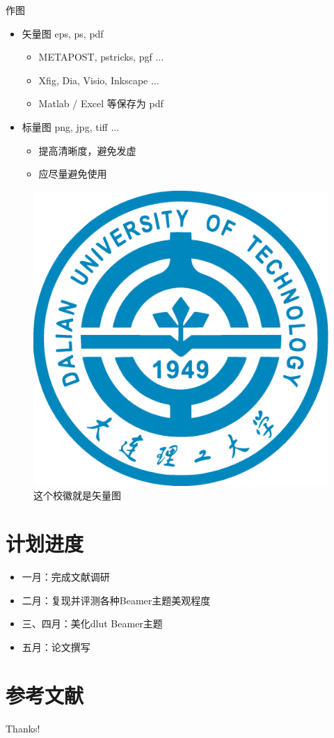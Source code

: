 \documentclass{beamer}
\begin{document}
\begin{frame}{作图}
    \begin{itemize}
        \item 矢量图 eps, ps, pdf
        \begin{itemize}
            \item METAPOST, pstricks, pgf $\ldots$
            \item Xfig, Dia, Visio, Inkscape $\ldots$
            \item Matlab / Excel 等保存为 pdf
        \end{itemize}
        \item 标量图 png, jpg, tiff $\ldots$
        \begin{itemize}
            \item 提高清晰度，避免发虚
            \item 应尽量避免使用
        \end{itemize}
    \end{itemize}
    \begin{figure}[htpb]
        \centering
        \includegraphics[width=0.2\linewidth]{pic/DLUT-logo.eps}
        \caption{这个校徽就是矢量图}
    \end{figure}
\end{frame}


\section{计划进度}
\begin{frame}
    \begin{itemize}
        \item 一月：完成文献调研
        \item 二月：复现并评测各种Beamer主题美观程度
        \item 三、四月：美化dlut Beamer主题
        \item 五月：论文撰写
    \end{itemize}
\end{frame}


\section{参考文献}

\begin{frame}[allowframebreaks]
    
    
\end{frame}

\begin{frame}
    \begin{center}
        {\Huge\calligra Thanks!}
    \end{center}
\end{frame}
\end{document}
